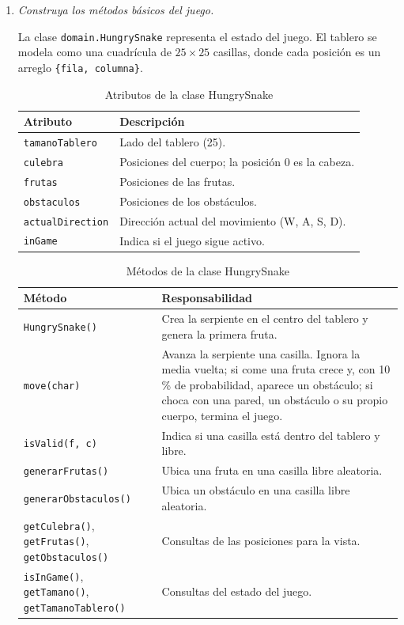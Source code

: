 \documentclass[12pt,letterpaper]{article}
\newcommand{\enunciado}[1]{\textit{#1}\par}
\begin{document}
\begin{enumerate}
  \item \enunciado{Construya los métodos básicos del juego.}

  La clase \texttt{domain.HungrySnake} representa el estado del juego. El tablero se modela como una cuadrícula de $25 \times 25$ casillas, donde cada posición es un arreglo \texttt{\{fila, columna\}}.

  \begin{table}[H]
    \centering
    \begin{tabularx}{\textwidth}{lX}
      \toprule
      \textbf{Atributo} & \textbf{Descripción} \\
      \midrule
      \texttt{tamanoTablero} & Lado del tablero (25). \\
      \texttt{culebra} & Posiciones del cuerpo; la posición 0 es la cabeza. \\
      \texttt{frutas} & Posiciones de las frutas. \\
      \texttt{obstaculos} & Posiciones de los obstáculos. \\
      \texttt{actualDirection} & Dirección actual del movimiento (W, A, S, D). \\
      \texttt{inGame} & Indica si el juego sigue activo. \\
      \bottomrule
    \end{tabularx}
    \caption{Atributos de la clase HungrySnake}
  \end{table}

  \begin{table}[H]
    \centering
    \begin{tabularx}{\textwidth}{lX}
      \toprule
      \textbf{Método} & \textbf{Responsabilidad} \\
      \midrule
      \texttt{HungrySnake()} & Crea la serpiente en el centro del tablero y genera la primera fruta. \\
      \texttt{move(char)} & Avanza la serpiente una casilla. Ignora la media vuelta; si come una fruta crece y, con 10\,\% de probabilidad, aparece un obstáculo; si choca con una pared, un obstáculo o su propio cuerpo, termina el juego. \\
      \texttt{isValid(f, c)} & Indica si una casilla está dentro del tablero y libre. \\
      \texttt{generarFrutas()} & Ubica una fruta en una casilla libre aleatoria. \\
      \texttt{generarObstaculos()} & Ubica un obstáculo en una casilla libre aleatoria. \\
      \texttt{getCulebra()}, \texttt{getFrutas()}, \texttt{getObstaculos()} & Consultas de las posiciones para la vista. \\
      \texttt{isInGame()}, \texttt{getTamano()}, \texttt{getTamanoTablero()} & Consultas del estado del juego. \\
      \bottomrule
    \end{tabularx}
    \caption{Métodos de la clase HungrySnake}
  \end{table}


\end{enumerate}
\end{document}
